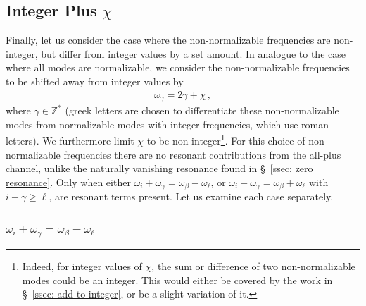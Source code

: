 \documentclass[letterpaper,11pt]{article}
\newcommand{\oi}{\omega_i}
\newcommand{\ol}{\omega_\ell}
\newcommand{\obet}{\omega_{\beta}}
\newcommand{\ogam}{\omega_\gamma}
\begin{document}
\subsection{Integer Plus $\chi$}
\label{ssec: intpluschi}

Finally, let us consider the case where the non-normalizable frequencies are non-integer, but differ from integer values by a set amount. In analogue to the case where all modes are normalizable, we consider the non-normalizable frequencies to be shifted away from integer values by
\begin{align}
\label{int plus chi}
\ogam = 2\gamma + \chi \, ,
\end{align}
where $\gamma \in \mathbb{Z}^*$ (greek letters are chosen to differentiate these non-normalizable modes from normalizable modes with integer frequencies, which use roman letters). We furthermore limit $\chi$ to be non-integer\footnote{Indeed, for integer values of $\chi$, the sum or difference of two non-normalizable modes could be an integer. This would either be covered by the work in \S\!~\ref{ssec: add to integer}, or be a slight variation of it.}. For this choice of non-normalizable frequencies there are no resonant contributions from the all-plus channel, unlike the naturally vanishing resonance found in \S\!~\ref{ssec: zero resonance}. Only when either $\oi + \ogam = \obet - \ol$, or $\oi + \ogam = \obet + \ol$ with $i + \gamma \geq \ell$, are resonant terms present. Let us examine each case separately.

\subsubsection{$\oi + \ogam = \obet - \ol$}
\label{sssec: intpluschi1}
\end{document}
